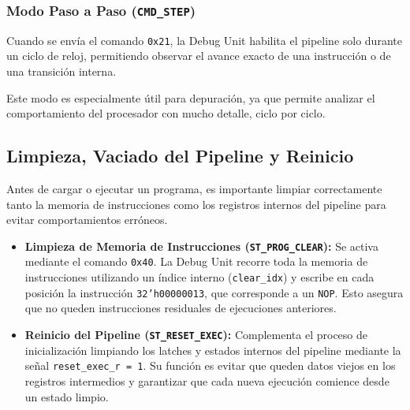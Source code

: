 \subsubsection{Modo Paso a Paso (\texttt{CMD\_STEP})}
Cuando se envía el comando \texttt{0x21}, la Debug Unit habilita el pipeline solo durante un ciclo de reloj, permitiendo observar el avance exacto de una instrucción o de una transición interna.

Este modo es especialmente útil para depuración, ya que permite analizar el comportamiento del procesador con mucho detalle, ciclo por ciclo.

\subsection{Limpieza, Vaciado del Pipeline y Reinicio}
Antes de cargar o ejecutar un programa, es importante limpiar correctamente tanto la memoria de instrucciones como los registros internos del pipeline para evitar comportamientos erróneos.

\begin{itemize}
    \item \textbf{Limpieza de Memoria de Instrucciones (\texttt{ST\_PROG\_CLEAR}):} Se activa mediante el comando \texttt{0x40}. La Debug Unit recorre toda la memoria de instrucciones utilizando un índice interno (\texttt{clear\_idx}) y escribe en cada posición la instrucción \texttt{32'h00000013}, que corresponde a un \texttt{NOP}. Esto asegura que no queden instrucciones residuales de ejecuciones anteriores.
    
    \item \textbf{Reinicio del Pipeline (\texttt{ST\_RESET\_EXEC}):} Complementa el proceso de inicialización limpiando los latches y estados internos del pipeline mediante la señal \texttt{reset\_exec\_r = 1}. Su función es evitar que queden datos viejos en los registros intermedios y garantizar que cada nueva ejecución comience desde un estado limpio.
\end{itemize}